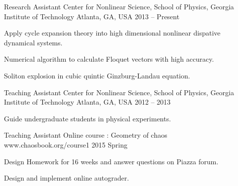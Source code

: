 


\begin{cventries}


\cventry
{Research Assistant}
{Center for Nonlinear Science, School of Physics,
  Georgia Institute of Technology}
{Atlanta, GA, USA}
{2013 -- Present}
{
  \begin{cvitems}
  \item {Apply cycle expansion theory into high dimensional nonlinear dispative dynamical systems.}
  \item {Numerical algorithm to calculate Floquet vectors with high accuracy.}
  \item {Soliton explosion in cubic quintic Ginzburg-Landau equation.} 
  \end{cvitems}
}


\cventry 
{Teaching Assistant}
{Center for Nonlinear Science, School of Physics,
  Georgia Institute of Technology}
{Atlanta, GA, USA}
{2012 -- 2013}
{
  \begin{cvitems}
  \item { Guide undergraduate students in physical experiments.}
  \end{cvitems}
}


\cventry 
{Teaching Assistant}
{Online course : Geometry of chaos}
{www.chaosbook.org/course1}
{2015 Spring}
{
  \begin{cvitems}
    \item {Design Homework for 16 weeks and answer questions on
        Piazza forum.}
    \item {Design and implement online autograder.}
  \end{cvitems}
}


\end{cventries}
